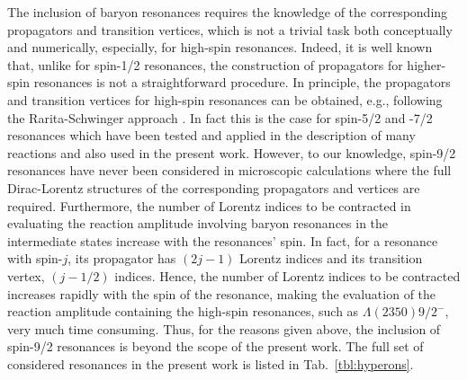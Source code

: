 \documentclass[10pt,aps,prc,superscriptaddress,twoside,twocolumn,nofootinbib,showpacs,preprintnumbers]{revtex4-1}
\newcommand{\cor}[2]{{\color{red} \sout{#1}} {\color{blue} #2}}
\begin{document}
\cor{}{The inclusion of baryon resonances requires the knowledge of the corresponding propagators and transition vertices, which is not a trivial task both conceptually and numerically, especially, for high-spin resonances. Indeed, it is well known that, unlike for spin-1/2 resonances, the construction of propagators for higher-spin resonances is not a straightforward procedure.   
In principle, the propagators and transition vertices for high-spin resonances can be obtained, e.g., following the Rarita-Schwinger approach \cite{BF57,R66,CHANG67}. In fact this is the case for spin-5/2 and -7/2 resonances which have been tested and applied in the description of many reactions \cite{NOH11,MON11,Jackson:2015dva,Wang:2017tpe} and also used in the present work. However, to our knowledge, spin-9/2 resonances have never been considered in microscopic calculations where the full Dirac-Lorentz structures of the corresponding propagators and vertices are required. Furthermore, the number of Lorentz indices to be contracted in evaluating the reaction amplitude involving baryon resonances in the intermediate states increase with the resonances' spin. In fact, for a resonance with spin-$j$, its propagator has $(2j-1)$ Lorentz indices and its transition vertex, $(j-1/2)$ indices. Hence, the number of Lorentz indices to be contracted increases rapidly with the spin of the resonance, making the evaluation of the reaction amplitude containing the high-spin resonances, such as $\Lambda(2350)9/2^-$, very much time consuming. Thus, for the reasons given above, the inclusion of spin-9/2 resonances is beyond the scope of the present work. }      
The full set of considered resonances \cor{}{in the present work} is listed in Tab.~\ref{tbl:hyperons}.
\end{document}
